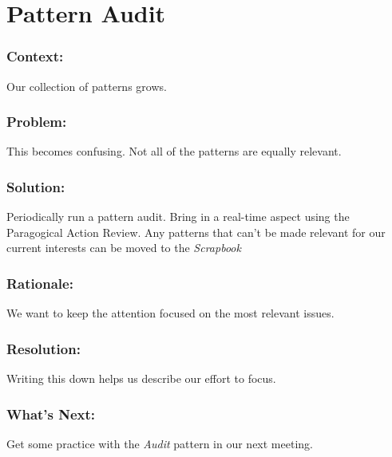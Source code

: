 \section{Pattern Audit}

\subsubsection*{Context:} Our collection of patterns grows.

\subsubsection*{Problem:} This becomes confusing.  Not all of the patterns are equally relevant.

\subsubsection*{Solution:} Periodically run a pattern audit.  Bring in a real-time aspect using the Paragogical Action Review.  Any patterns that can't be made relevant for our current interests can be moved to the \emph{Scrapbook}

\subsubsection*{Rationale:} We want to keep the attention focused on the most relevant issues.

\subsubsection*{Resolution:} Writing this down helps us describe our effort to focus.

\subsubsection*{What's Next:} Get some practice with the \emph{Audit} pattern in our next meeting.
